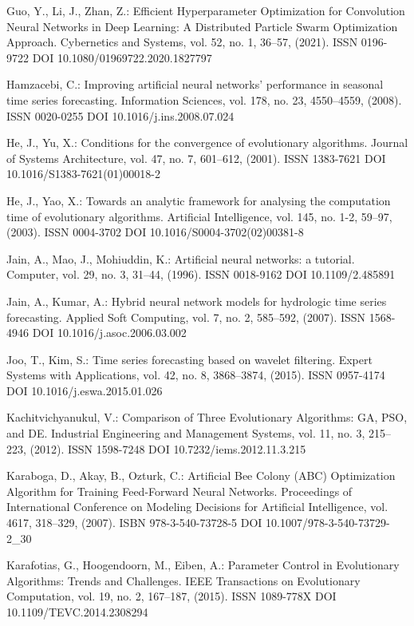 \begin{thebibliography}{99.}
 Guo, Y., Li, J., Zhan, Z.: Efficient Hyperparameter Optimization for Convolution Neural Networks in Deep Learning: A Distributed Particle Swarm Optimization Approach. Cybernetics and Systems, vol. 52, no. 1, 36--57, (2021). ISSN 0196-9722 DOI 10.1080/01969722.2020.1827797

 Hamzacebi, C.: Improving artificial neural networks’ performance in seasonal time series forecasting. Information Sciences, vol. 178, no. 23, 4550--4559, (2008). ISSN 0020-0255 DOI 10.1016/j.ins.2008.07.024

 He, J., Yu, X.: Conditions for the convergence of evolutionary algorithms. Journal of Systems Architecture, vol. 47, no. 7, 601--612, (2001). ISSN 1383-7621 DOI 10.1016/S1383-7621(01)00018-2

 He, J., Yao, X.: Towards an analytic framework for analysing the computation time of evolutionary algorithms. Artificial Intelligence, vol. 145, no. 1-2, 59--97, (2003). ISSN 0004-3702 DOI 10.1016/S0004-3702(02)00381-8

 Jain, A., Mao, J., Mohiuddin, K.: Artificial neural networks: a tutorial. Computer, vol. 29, no. 3, 31--44, (1996). ISSN 0018-9162 DOI 10.1109/2.485891

 Jain, A., Kumar, A.: Hybrid neural network models for hydrologic time series forecasting. Applied Soft Computing, vol. 7, no. 2, 585--592, (2007). ISSN 1568-4946 DOI 10.1016/j.asoc.2006.03.002

 Joo, T., Kim, S.: Time series forecasting based on wavelet filtering. Expert Systems with Applications, vol. 42, no. 8, 3868--3874, (2015). ISSN 0957-4174 DOI 10.1016/j.eswa.2015.01.026

 Kachitvichyanukul, V.: Comparison of Three Evolutionary Algorithms: GA, PSO, and DE. Industrial Engineering and Management Systems, vol. 11, no. 3, 215--223, (2012). ISSN 1598-7248 DOI 10.7232/iems.2012.11.3.215

 Karaboga, D., Akay, B., Ozturk, C.: Artificial Bee Colony (ABC) Optimization Algorithm for Training Feed-Forward Neural Networks. Proceedings of International Conference on Modeling Decisions for Artificial Intelligence, vol. 4617, 318--329, (2007). ISBN 978-3-540-73728-5 DOI 10.1007/978-3-540-73729-2\_30

 Karafotias, G., Hoogendoorn, M., Eiben, A.: Parameter Control in Evolutionary Algorithms: Trends and Challenges. IEEE Transactions on Evolutionary Computation, vol. 19, no. 2, 167--187, (2015). ISSN 1089-778X DOI 10.1109/TEVC.2014.2308294


\end{thebibliography}
